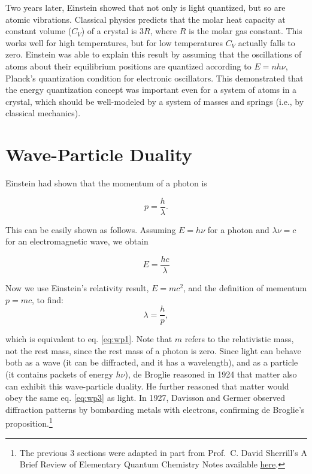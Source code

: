 \documentclass[
  9pt,
]{extbook}
\theoremstyle{definition}
\theoremstyle{definition}
\theoremstyle{definition}
\theoremstyle{remark}
\begin{document}
Two years later, Einstein showed that not only is light quantized, but so are atomic vibrations. Classical physics predicts that the molar heat capacity at constant volume (\(C_V\)) of a crystal is \(3 R\), where \(R\) is the molar gas constant. This works well for high temperatures, but for low temperatures \(C_V\) actually falls to zero. Einstein was able to explain this result by assuming that the oscillations of atoms about their equilibrium positions are quantized according to \(E = n h \nu\), Planck's quantization condition for electronic oscillators. This demonstrated that the energy quantization concept was important even for a system of atoms in a crystal, which should be well-modeled by a system of masses and springs (i.e., by classical mechanics).

\hypertarget{wave-particle-duality}{%
\section{Wave-Particle Duality}\label{wave-particle-duality}}

Einstein had shown that the momentum of a photon is

\begin{equation}
p = \frac{h}{\lambda}.
\label{eq:wp1}
\end{equation}

This can be easily shown as follows. Assuming \(E = h \nu\) for a photon and \(\lambda \nu = c\) for an electromagnetic wave, we obtain

\begin{equation}
E = \frac{h c}{\lambda}
\label{eq:wp2}
\end{equation}

Now we use Einstein's relativity result, \(E = m c^2\), and the definition of mementum \(p=mc\), to find:
\begin{equation}
\lambda = \frac{h}{p},
\label{eq:wp3}
\end{equation}

which is equivalent to eq. \eqref{eq:wp1}. Note that \(m\) refers to the relativistic mass, not the rest mass, since the rest mass of a photon is zero. Since light can behave both as a wave (it can be diffracted, and it has a wavelength), and as a particle (it contains packets of energy \(h \nu\)), de Broglie reasoned in 1924 that matter also can exhibit this wave-particle duality. He further reasoned that matter would obey the same eq. \eqref{eq:wp3} as light. In 1927, Davisson and Germer observed diffraction patterns by bombarding metals with electrons, confirming de Broglie's proposition.\footnote{The previous 3 sections were adapted in part from Prof.~C. David Sherrill's A Brief Review of Elementary Quantum Chemistry Notes available \href{http://vergil.chemistry.gatech.edu/notes/quantrev/node1.html}{here}.}
\end{document}
